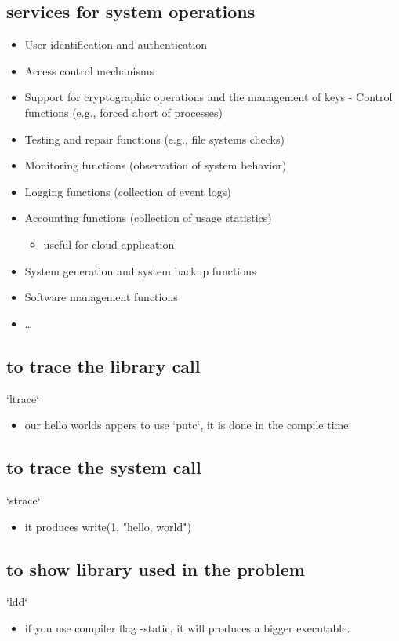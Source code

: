 \documentclass[11pt]{article}
\begin{document}
\subsection{services for system operations}
\label{sec:orgb5bea22}
\begin{itemize}
\item User identification and authentication
\item Access control mechanisms
\item Support for cryptographic operations and the management of keys - Control functions (e.g., forced abort of processes)
\item Testing and repair functions (e.g., file systems checks)
\item Monitoring functions (observation of system behavior)
\item Logging functions (collection of event logs)
\item Accounting functions (collection of usage statistics)
\begin{itemize}
\item useful for cloud application
\end{itemize}
\item System generation and system backup functions
\item Software management functions
\item \ldots{}
\end{itemize}
\subsection{to trace the library call}
\label{sec:orgf8dfd69}
`ltrace`
\begin{itemize}
\item our hello worlds appers to use `putc`, it is done in the compile time
\end{itemize}
\subsection{to trace the system call}
\label{sec:org63f0631}
`strace`
\begin{itemize}
\item it produces write(1, "hello, world")
\end{itemize}
\subsection{to show library used in the problem}
\label{sec:org506a7ff}
`ldd`
\begin{itemize}
\item if you use compiler flag -static, it will produces a bigger executable.
\end{itemize}
\end{document}
